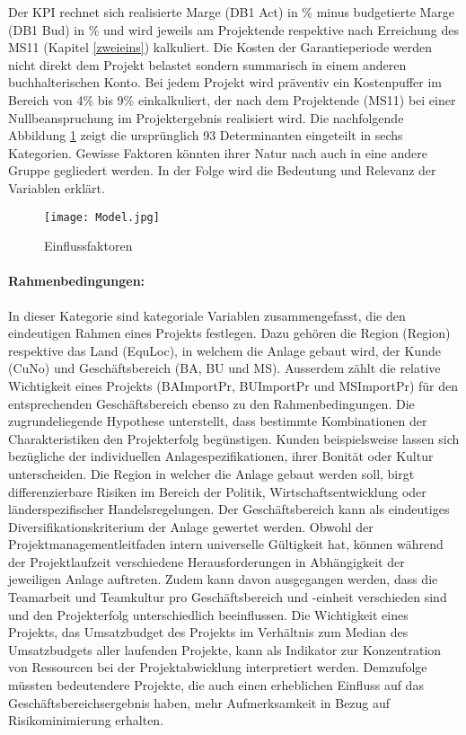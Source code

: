 Der KPI rechnet sich realisierte Marge (DB1 Act) in \% minus budgetierte Marge (DB1 Bud) in \% und wird jeweils am Projektende respektive nach Erreichung des MS11 (Kapitel \ref{zweieins}) kalkuliert. Die Kosten der Garantieperiode werden nicht direkt dem Projekt belastet sondern summarisch in einem anderen buchhalterischen Konto. Bei jedem Projekt wird präventiv ein Kostenpuffer im Bereich von 4\% bis 9\% einkalkuliert, der nach dem Projektende (MS11) bei einer Nullbeanspruchung im Projektergebnis realisiert wird.
\newline Die nachfolgende Abbildung \ref{Einflussfaktoren} zeigt die ursprünglich 93 Determinanten eingeteilt in sechs Kategorien. Gewisse Faktoren könnten ihrer Natur nach auch in eine andere Gruppe gegliedert werden. In der Folge wird die Bedeutung und Relevanz der Variablen erklärt.
\begin{figure}[H]
	\centering
	\texttt{[image: Model.jpg]}
	\caption{Einflussfaktoren
	\label{Einflussfaktoren}}
\end{figure}
\paragraph{Rahmenbedingungen:} In dieser Kategorie sind kategoriale Variablen zusammengefasst, die den eindeutigen Rahmen eines Projekts festlegen. Dazu gehören die Region (Region) respektive das Land (EquLoc), in welchem die Anlage gebaut wird, der Kunde (CuNo) und Geschäftsbereich (BA, BU und MS). Ausserdem zählt die relative Wichtigkeit eines Projekts (BAImportPr, BUImportPr und MSImportPr) für den entsprechenden Geschäftsbereich ebenso zu den Rahmenbedingungen. Die zugrundeliegende Hypothese unterstellt, dass bestimmte Kombinationen der Charakteristiken den Projekterfolg begünstigen. Kunden beispielsweise lassen sich bezügliche der individuellen Anlagespezifikationen, ihrer Bonität oder Kultur unterscheiden. Die Region in welcher die Anlage gebaut werden soll, birgt differenzierbare Risiken im Bereich der Politik, Wirtschaftsentwicklung oder länderspezifischer Handelsregelungen. Der Geschäftsbereich kann als eindeutiges Diversifikationskriterium der Anlage gewertet werden. Obwohl der Projektmanagementleitfaden intern universelle Gültigkeit hat, können während der Projektlaufzeit verschiedene Herausforderungen in Abhängigkeit der jeweiligen Anlage auftreten. Zudem kann davon ausgegangen werden, dass die Teamarbeit und Teamkultur pro Geschäftsbereich und -einheit verschieden sind und den Projekterfolg unterschiedlich beeinflussen. Die Wichtigkeit eines Projekts, das Umsatzbudget des Projekts im Verhältnis zum Median des Umsatzbudgets aller laufenden Projekte, kann als Indikator zur Konzentration von Ressourcen bei der Projektabwicklung interpretiert werden. Demzufolge müssten bedeutendere Projekte, die auch einen erheblichen Einfluss auf das Geschäftsbereichsergebnis haben, mehr Aufmerksamkeit in Bezug auf Risikominimierung erhalten.
